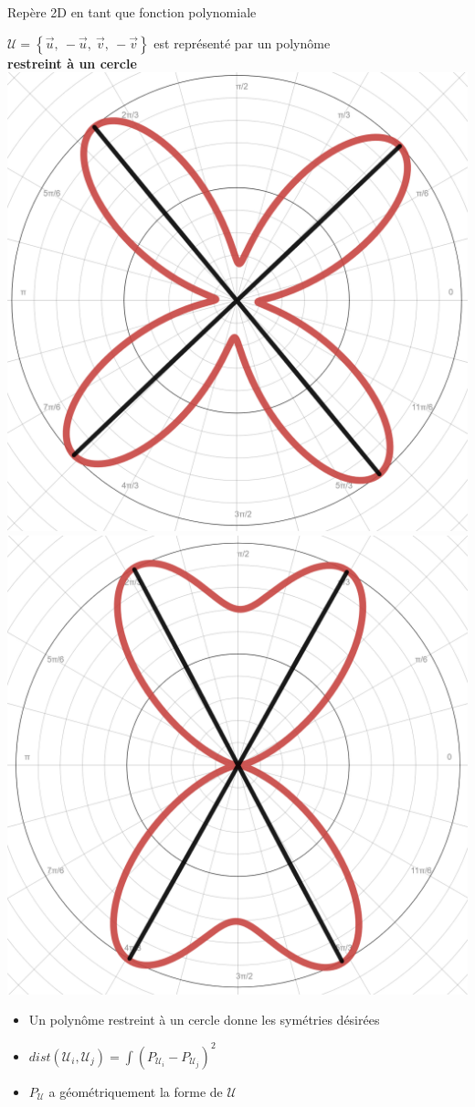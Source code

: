 \documentclass{beamer}
\begin{document}
\begin{frame}{Repère 2D en tant que fonction polynomiale}
    \centering
    \vspace*{0.2\baselineskip}
    \small{
    $\mathcal{U} = \left\{\vec{u},\ -\vec{u},\ \vec{v},\ -\vec{v}\right\}$ est représenté par un polynôme \\
    \textbf{restreint à un cercle} \\
    \vspace*{0.45\baselineskip}
    \includegraphics[width=0.36\linewidth]{img_spm_ff/poly_2D_8_2.PNG}
    \includegraphics[width=0.36\linewidth]{img_spm_ff/poly_2D_8_1.PNG}
    
    \begin{itemize}
    \item Un polynôme restreint à un cercle donne les symétries désirées
    \item $dist(\mathcal{U}_i, \mathcal{U}_j) = \int (P_{\mathcal{U}_i} - P_{\mathcal{U}_j})^2$
    \item $P_\mathcal{U}$ a géométriquement la forme de $\mathcal{U}$ 
    \end{itemize}
    }
\end{frame}
\end{document}
